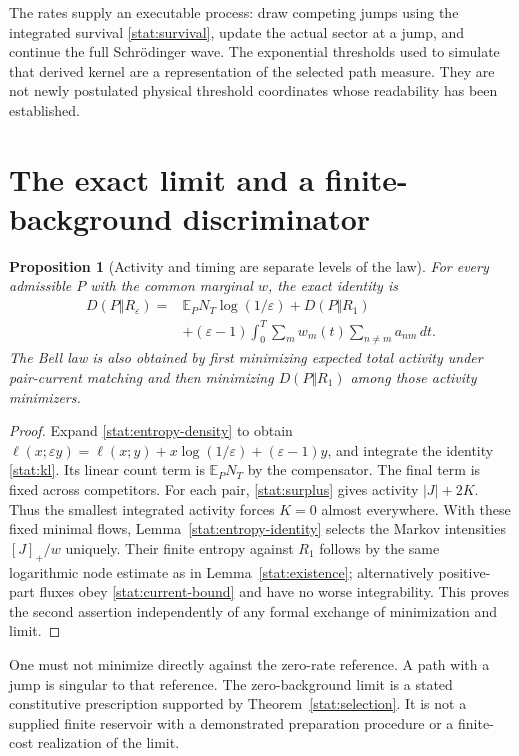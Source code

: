 \documentclass[11pt,oneside,openany]{book}
\newtheorem{proposition}[theorem]{Proposition}
\theoremstyle{definition}
\theoremstyle{remark}\newtheorem{remark}[theorem]{Remark}
\begin{document}
The rates supply an executable process: draw competing jumps using the
integrated survival \eqref{stat:survival}, update the actual sector at a
jump, and continue the full Schr\"odinger wave. The exponential thresholds
used to simulate that derived kernel are a representation of the selected
path measure. They are not newly postulated physical threshold coordinates
whose readability has been established.

\section{The exact limit and a finite-background discriminator}

\begin{proposition}[Activity and timing are separate levels of the law]
\label{stat:lexicographic}
For every admissible $P$ with the common marginal $w$, the exact identity is
\begin{align}\label{stat:entropy-expansion}
 D(P\Vert R_\varepsilon)
 ={}&\mathbb E_PN_T\log(1/\varepsilon)+D(P\Vert R_1)\\
 &+(\varepsilon-1)\int_0^T\sum_m w_m(t)
                  \sum_{n\ne m}a_{nm}\,dt.\nonumber
\end{align}
The Bell law is also obtained by first minimizing expected total activity
under pair-current matching and then minimizing $D(P\Vert R_1)$ among
those activity minimizers.
\end{proposition}
\begin{proof}
Expand \eqref{stat:entropy-density} to obtain
$\ell(x;\varepsilon y)=\ell(x;y)+x\log(1/\varepsilon)
 +(\varepsilon-1)y$, and integrate the identity
\eqref{stat:kl}. Its linear count term is $\mathbb E_PN_T$ by the
compensator. The final term is fixed across competitors.
For each pair, \eqref{stat:surplus} gives activity $|J|+2K$.
Thus the smallest integrated activity forces $K=0$ almost everywhere.
With these fixed minimal flows, Lemma~\ref{stat:entropy-identity} selects
the Markov intensities $[J]_+/w$ uniquely. Their finite entropy against
$R_1$ follows by the same logarithmic node estimate as in
Lemma~\ref{stat:existence}; alternatively positive-part fluxes obey
\eqref{stat:current-bound} and have no worse integrability. This proves
the second assertion independently of any formal exchange of minimization
and limit.
\end{proof}

One must not minimize directly against the zero-rate reference. A path with
a jump is singular to that reference. The zero-background limit is a
stated constitutive prescription supported by Theorem~\ref{stat:selection}.
It is not a supplied finite reservoir with a demonstrated preparation
procedure or a finite-cost realization of the limit.
\end{document}
